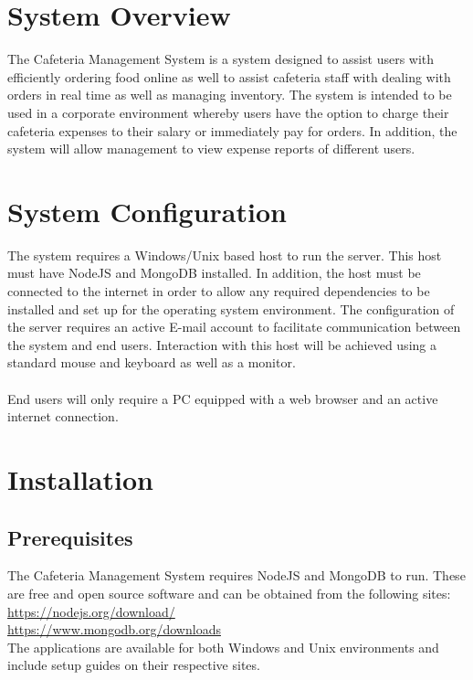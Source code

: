 \documentclass[12pt]{article}
\begin{document}
\maketitle
\break

\tableofcontents
\break

\section{System Overview}
The Cafeteria Management System is a system designed to assist users with efficiently ordering food online as well to assist cafeteria staff with dealing with orders in real time as well as managing inventory. The system is intended to be used in a corporate environment whereby users have the option to charge their cafeteria expenses to their salary or immediately pay for orders. In addition, the system will allow management to view expense reports of different users.

\section{System Configuration}
The system requires a Windows/Unix based host to run the server. This host must have NodeJS and MongoDB installed. In addition, the host must be connected to the internet in order to allow any required dependencies to be installed and set up for the operating system environment. The configuration of the server requires an active E-mail account to facilitate communication between the system and end users. Interaction with this host will be achieved using a standard mouse and keyboard as well as a monitor.\\
\\
End users will only require a PC equipped with a web browser and an active internet connection.

\section{Installation}
\subsection{Prerequisites}
The Cafeteria Management System requires NodeJS and MongoDB to run. These are free and open source software and can be obtained from the following sites:\\
\url{https://nodejs.org/download/} \\
\url{https://www.mongodb.org/downloads} \\
The applications are available for both Windows and Unix environments and include setup guides on their respective sites.\\
\end{document}
